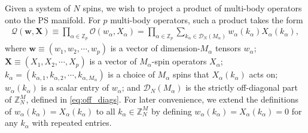 \documentclass[nofootinbib,notitlepage,11pt]{revtex4-2}
\newcommand{\p}[1]{\left(#1\right)} %
\newcommand{\m}{\bm} %
\newcommand{\1}{\mathds{1}}
\newcommand{\D}{\mathcal{D}}
\renewcommand{\O}{\mathcal{O}}
\newcommand{\Q}{\mathcal{Q}}
\newcommand{\ZZ}{\mathbb{Z}}
\begin{document}
Given a system of $N$ spins, we wish to project a product of multi-body operators onto the PS manifold.
For $p$ multi-body operators, such a product takes the form
\begin{align}
  \Q\p{\m w,\m X}
  \equiv \prod_{\alpha\in\ZZ_p} \O\p{w_\alpha,X_\alpha}
  = \prod_{\alpha\in\ZZ_p} \sum_{k_\alpha\in\D_N\p{M_\alpha}}
  w_\alpha\p{k_\alpha} X_\alpha\p{k_\alpha},
  \label{eq:sym_prod_start}
\end{align}
where $\m w\equiv\p{w_1,w_2,\cdots,w_p}$ is a vector of dimension-$M_\alpha$ tensors $w_\alpha$; $\m X\equiv\p{X_1,X_2,\cdots,X_p}$ is a vector of $M_\alpha$-spin operators $X_\alpha$; $k_\alpha=\p{k_{\alpha,1},k_{\alpha,2},\cdots,k_{\alpha,M_\alpha}}$ is a choice of $M_\alpha$ spins that $X_\alpha\p{k_\alpha}$ acts on; $w_\alpha\p{k_\alpha}$ is a scalar entry of $w_\alpha$; and $\D_N\p{M_\alpha}$ is the strictly off-diagonal part of $\ZZ_N^M$, defined in \eqref{eq:off_diags}.
For later convenience, we extend the definitions of $w_\alpha\p{k_\alpha}=X_\alpha\p{k_\alpha}$ to all $k_\alpha\in\ZZ_N^M$ by defining $w_\alpha\p{k_\alpha}=X_\alpha\p{k_\alpha}=0$ for any $k_\alpha$ with repeated entries.
\end{document}
